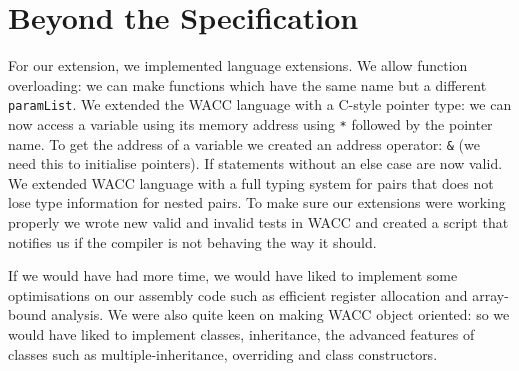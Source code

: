 \documentclass[11pt,a4paper]{article}
\begin{document}
\section{Beyond the Specification}
\label{sec:Beyond the Specification}
For our extension, we implemented language extensions. We allow function overloading: we can make functions which have the same name but a different \texttt{paramList}. We extended the WACC language with a C-style pointer type: we can now access a variable using its memory address using \texttt{*} followed by the pointer name. To get the address of a variable we created an address operator: \texttt{\&} (we need this to initialise pointers). If statements without an else case are now valid. We extended WACC language with a full typing system for pairs that does not lose type information for nested pairs.
To make sure our extensions were working properly we wrote new valid and invalid tests in WACC and created a script that notifies us if the compiler is not behaving the way it should.

If we would have had more time, we would have liked to implement some optimisations on our assembly code such as efficient register allocation and array-bound analysis. We were also quite keen on making WACC object oriented: so we would have liked to implement classes, inheritance, the advanced features of classes such as multiple-inheritance, overriding and class constructors.
\end{document}
